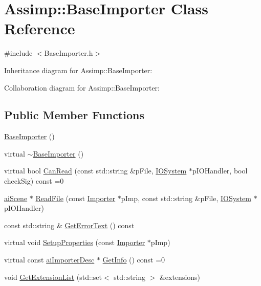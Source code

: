 \hypertarget{class_assimp_1_1_base_importer}{\section{Assimp\+:\+:Base\+Importer Class Reference}
\label{class_assimp_1_1_base_importer}
}


{\ttfamily \#include $<$Base\+Importer.\+h$>$}



Inheritance diagram for Assimp\+:\+:Base\+Importer\+:


Collaboration diagram for Assimp\+:\+:Base\+Importer\+:
\subsection*{Public Member Functions}
\begin{DoxyCompactItemize}
\item 
\hyperlink{class_assimp_1_1_base_importer_a2d5c9b023d51d9145c841f95c3e21ca5}{Base\+Importer} ()
\item 
virtual \hyperlink{class_assimp_1_1_base_importer_a809ce474153402b8fc8c5a1add89a855}{$\sim$\+Base\+Importer} ()
\item 
virtual bool \hyperlink{class_assimp_1_1_base_importer_a13588d3396ba5b7ed1f1cb46e0945cfd}{Can\+Read} (const std\+::string \&p\+File, \hyperlink{class_assimp_1_1_i_o_system}{I\+O\+System} $\ast$p\+I\+O\+Handler, bool check\+Sig) const =0
\item 
\hyperlink{structai_scene}{ai\+Scene} $\ast$ \hyperlink{class_assimp_1_1_base_importer_a5e9568561199cd13f2935ef01ee5280c}{Read\+File} (const \hyperlink{class_assimp_1_1_importer}{Importer} $\ast$p\+Imp, const std\+::string \&p\+File, \hyperlink{class_assimp_1_1_i_o_system}{I\+O\+System} $\ast$p\+I\+O\+Handler)
\item 
const std\+::string \& \hyperlink{class_assimp_1_1_base_importer_a223f616a340ef2a56c12403f8758f0e7}{Get\+Error\+Text} () const 
\item 
virtual void \hyperlink{class_assimp_1_1_base_importer_a2ecaa6b808b2b282cb6aa321970a2ad3}{Setup\+Properties} (const \hyperlink{class_assimp_1_1_importer}{Importer} $\ast$p\+Imp)
\item 
virtual const \hyperlink{structai_importer_desc}{ai\+Importer\+Desc} $\ast$ \hyperlink{class_assimp_1_1_base_importer_a070b8c3f63767ad535c8ac509b725fc4}{Get\+Info} () const =0
\item 
void \hyperlink{class_assimp_1_1_base_importer_a7ac75d5fcfe8784173bf117a912bafeb}{Get\+Extension\+List} (std\+::set$<$ std\+::string $>$ \&extensions)
\end{DoxyCompactItemize}
